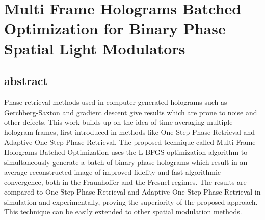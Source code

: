 \chapter{Multi Frame Holograms Batched Optimization for Binary Phase Spatial Light Modulators}

\graphicspath{{Chapter5/Figs/}}


\section{abstract}
	Phase retrieval methods used in computer generated holograms such as Gerchberg-Saxton and gradient descent give results which are prone to noise and other defects. This work builds up on the idea of time-averaging multiple hologram frames, first introduced in methods like One-Step Phase-Retrieval and Adaptive One-Step Phase-Retrieval. The proposed technique called Multi-Frame Holograms Batched Optimization  uses the L-BFGS optimization algorithm to simultaneously generate a batch of binary phase holograms which result in an average reconstructed image of improved fidelity and fast algorithmic convergence, both in the Fraunhoffer and the Fresnel regimes. The results are compared to One-Step Phase-Retrieval and Adaptive One-Step Phase-Retrieval in simulation and experimentally, proving the superiority of the proposed approach. This technique can be easily extended to other spatial modulation methods.

